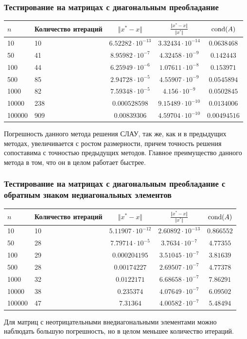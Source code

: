 \documentclass[english]{article}
\begin{document}
\subsubsection{Тестирование на матрицах с диагональным преобладание}

\begin{center}
  \begin{longtable}{l|l|c|c|c}
    \(n\) & Количество итераций & \(\Vert x^* - x \Vert\) & \(\frac{\Vert x^* - x \Vert}{\Vert x^* \Vert}\) & \(\mathop{\rm cond}(A) \)\\
    \hline
    10 & 10 & \(6.52282\cdot 10^{-13}\) & \(3.32434\cdot 10^{-14}\) & \(0.0638468\) \\
    50 & 41 & \(8.95982\cdot 10^{-7}\) & \(4.32458\cdot 10^{-9}\) & \(0.142443\) \\
    100 & 44 & \(6.25949\cdot 10^{-6}\) & \(1.07611\cdot 10^{-8}\) & \(0.153971\) \\
    500 & 85 & \(2.94728\cdot 10^{-5}\) & \(4.55907\cdot 10^{-9}\) & \(0.0545894\) \\
    1000 & 82 & \(7.59348\cdot 10^{-5}\) & \(4.156\cdot 10^{-9}\) & \(0.0502845\) \\
    10000 & 238 & \(0.000528598\) & \(9.15489\cdot 10^{-10}\) & \(0.0134006\) \\
    100000 & 909 & \(0.00839306\) & \(4.59704\cdot 10^{-10}\) & \(0.00494516\)
  \end{longtable}
\end{center}
Погрешность данного метода решения СЛАУ, так же, как и в предыдущих
методах, увеличивается с ростом размерности, причем точность решения
сопоставима с точностью предыдущих методов. Главное преимущество
данного метода в том, что он в целом работает быстрее.
\subsubsection{Тестирование на матрицах с диагональным преобладание с обратным знаком недиагональных элементов}
\begin{center}
  \begin{longtable}{l|l|c|c|c}
    \(n\) & Количество итераций & \(\Vert x^* - x \Vert\) & \(\frac{\Vert x^* - x \Vert}{\Vert x^* \Vert}\) & \(\mathop{\rm cond}(A) \)\\
    \hline
    10 & 10 & \(5.11907\cdot 10^{-12}\) & \(2.60892\cdot 10^{-13}\) & \(0.866552\) \\
    50 & 28 & \(7.79714\cdot 10^{-5}\) & \(3.7634\cdot 10^{-7}\) & \(4.77355\) \\
    100 & 29 & \(0.000204195\) & \(3.51045\cdot 10^{-7}\) & \(3.81639\) \\
    500 & 28 & \(0.00174227\) & \(2.69507\cdot 10^{-7}\) & \(4.77378\) \\
    1000 & 32 & \(0.0122171\) & \(6.68658\cdot 10^{-7}\) & \(7.86291\) \\
    10000 & 38 & \(0.235374\) & \(4.07649\cdot 10^{-7}\) & \(6.09502\) \\
    100000 & 47 & \(7.31364\) & \(4.00582\cdot 10^{-7}\) & \(5.48494\)
  \end{longtable}
\end{center}
Для матриц с неотрицательными внедиагональными элементами можно наблюдать большую погрешность, но в целом меньшее количество итераций.
\end{document}
